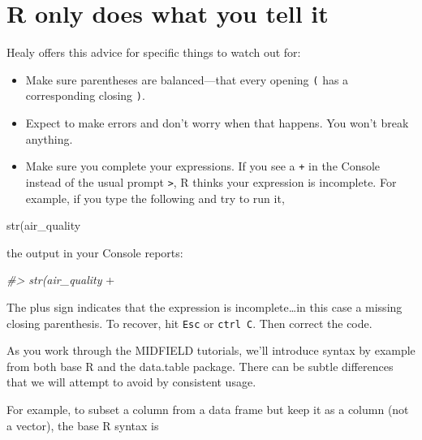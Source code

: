 \documentclass[
]{book}
\newenvironment{Shaded}{\begin{snugshade}}{\end{snugshade}}
\newcommand{\CommentTok}[1]{\textcolor[rgb]{0.56,0.35,0.01}{\textit{#1}}}
\newcommand{\FunctionTok}[1]{\textcolor[rgb]{0.00,0.00,0.00}{#1}}
\newcommand{\NormalTok}[1]{#1}
\newcommand{\SpecialCharTok}[1]{\textcolor[rgb]{0.00,0.00,0.00}{#1}}
\providecommand{\tightlist}{%
  \setlength{\itemsep}{0pt}\setlength{\parskip}{0pt}}
\begin{document}
\hypertarget{r-only-does-what-you-tell-it}{%
\section{R only does what you tell it}\label{r-only-does-what-you-tell-it}}

Healy \citeyearpar{Healy:2019} offers this advice for specific things to watch out for:

\begin{itemize}
\tightlist
\item
  Make sure parentheses are balanced---that every opening \texttt{(} has a corresponding closing \texttt{)}.\\
\item
  Expect to make errors and don't worry when that happens. You won't break anything.
\item
  Make sure you complete your expressions. If you see a \texttt{+} in the Console instead of the usual prompt \texttt{\textgreater{}}, R thinks your expression is incomplete. For example, if you type the following and try to run it,
\end{itemize}

\begin{Shaded}
\begin{Highlighting}[]
    \FunctionTok{str}\NormalTok{(air\_quality}
\end{Highlighting}
\end{Shaded}

the output in your Console reports:

\begin{Shaded}
\begin{Highlighting}[]
    \CommentTok{\#\textgreater{} str(air\_quality}
    \SpecialCharTok{+} 
\end{Highlighting}
\end{Shaded}

The plus sign indicates that the expression is incomplete\ldots in this case a missing closing parenthesis. To recover, hit \texttt{Esc} or \texttt{ctrl\ C}. Then correct the code.

As you work through the MIDFIELD tutorials, we'll introduce syntax by example from both base R and the data.table package. There can be subtle differences that we will attempt to avoid by consistent usage.

For example, to subset a column from a data frame but keep it as a column (not a vector), the base R syntax is
\end{document}

